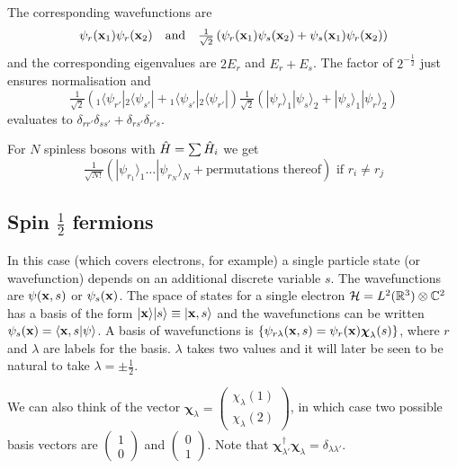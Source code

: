 \documentclass{notes}
\newcommand{\cH}{\mathcal{H}}
\newcommand{\bra}[1]{\langle#1|}
\newcommand{\ket}[1]{|#1\rangle}
\newcommand{\scp}[2]{\langle#1|#2\rangle}
\newcommand{\cv}{\boldsymbol{\chi}}
\begin{document}
The corresponding wavefunctions are
\[
\psi_r(\mathbf{x}_1) \psi_r(\mathbf{x}_2) \quad \text{and} \quad
\tfrac{1}{\sqrt{2}} \left(\psi_r(\mathbf{x}_1) \psi_s(\mathbf{x}_2)
+ \psi_s(\mathbf{x}_1) \psi_r(\mathbf{x}_2) \right)
\]
and the corresponding eigenvalues are $2 E_r$ and $E_r + E_s$.
The factor of $2^{-\frac{1}{2}}$ just ensures normalisation and
\[
\tfrac{1}{\sqrt{2}} \left(
{}_1\!
\bra{\psi_{r'}} {}_2\! \bra{\psi_{s'}} + {}_1\! \bra{\psi_{s'}} {}_2
\!\bra{\psi_{r'}}
\right)
\tfrac{1}{\sqrt{2}} \left(
\ket{\psi_r}_1 \ket{\psi_s}_2 + \ket{\psi_s}_1 \ket{\psi_r}_2
\right)
\]
evaluates to $\delta_{r r'} \delta_{s s'} + \delta_{r s'} \delta_{r' s}$.

For $N$ spinless bosons with $\Hat{H} = \sum \Hat{H}_i$ we get
\[
\tfrac{1}{\sqrt{N!}} \left(
\ket{\psi_{r_1}}_1 \dots \ket{\psi_{r_N}}_N + \text{permutations thereof}
\right) \text{ if } r_i \neq r_j
\]

\subsection{Spin $\frac{1}{2}$ fermions}

In this case (which covers electrons, for example) a single particle state
(or wavefunction) depends on an additional discrete variable $s$.
The wavefunctions are $\psi(\mathbf{x},s)$ or $\psi_s(\mathbf{x})$.  The space
of states for a single electron $\cH = L^2(\R^3) \otimes \C^2$ has a basis of
the form $\ket{\vect{x}} \ket{s} \equiv \ket{\vect{x},s}$ and the
wavefunctions can be written $\psi_s(\vect{x}) = \scp{\vect{x},s}{\psi}$.
A basis of wavefunctions is $\{ \psi_{r \lambda}(\vect{x},s)
= \psi_r(\vect{x}) \cv_\lambda(s)\}$, where $r$ and $\lambda$ are labels
for the basis.  $\lambda$ takes two values and it will later be seen to
be natural to take $\lambda = \pm \tfrac{1}{2}$.

We can also think of the vector $\cv_\lambda = \begin{pmatrix}
\chi_\lambda(1) \\ \chi_\lambda(2)
\end{pmatrix}$, in which case two possible basis vectors are
$\begin{pmatrix} 1 \\ 0 \end{pmatrix}$ and $\begin{pmatrix} 0 \\ 1
\end{pmatrix}$.  Note that $\cv_{\lambda'}^\dag \cv_\lambda^{}
= \delta_{\lambda \lambda'}$.
\end{document}
